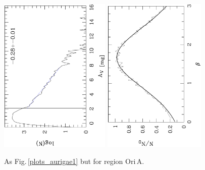 \documentclass[useAMS,usenatbib]{mn2e}
\begin{document}
\begin{appendix}
\begin{figure}
\includegraphics[height=7.5cm,angle=-90]{av_dist_orib.ps}
\hfill
\includegraphics[height=7.5cm,angle=-90]{histo_orib.ps}
\caption{\label{plots_orib} As Fig.\,\ref{plots_aurigae1} but for region
Ori\,A.} 
\end{figure}


\end{appendix}
\end{document}
